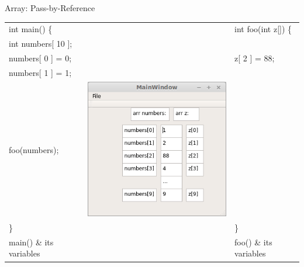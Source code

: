 \documentclass[presentation]{beamer}
\begin{document}
\begin{frame}[label=sec-9]{Array: Pass-by-Reference}
\begin{center}
\begin{tabular}{lll}
\hline
int main() \{ &  & int foo(int z[]) \{\\
int numbers[ 10 ]; &  & \\
numbers[ 0 ] = 0; &  & z[ 2 ] = 88;\\
numbers[ 1 ] = 1; &  & \\
foo(numbers); & \includegraphics[width=.4\linewidth]{./array.png} & \\
\} &  & \}\\
\alert{main() \& its variables} &  & \alert{foo() \& its variables}\\
\hline
\end{tabular}
\end{center}
\end{frame}
\end{document}
